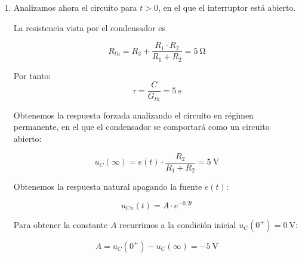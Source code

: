 \begin{enumerate}
\item

  Analizamos ahora el circuito para $t > 0$, en el que el interruptor
  está abierto.


  \begin{minipage}{0.6\linewidth}
    La resistencia vista por el condensador es

  \[
    R_{th} = R_3 + \frac{R_1 \cdot R_2}{R_1 + R_2} = \qty{5}{\ohm}
  \]

  Por tanto:
  \begin{equation*}
    \tau = \frac{C}{G_{th}} = \qty{5}{\second}
  \end{equation*}
\end{minipage}
\begin{minipage}{0.4\linewidth}
\end{minipage}

Obtenemos la respuesta forzada analizando el circuito en régimen
permanente, en el que el condensador se comportará como un circuito
abierto:

\begin{equation*}
  u_{C}(\infty) = e(t) \cdot \frac{R_2}{R_1 + R_2} = \qty{5}{\volt}
\end{equation*}

Obtenemos la respuesta natural apagando la fuente $e(t)$:

\begin{equation*}
  u_{Cn}(t) = A \cdot e^{-0.2t}
\end{equation*}

Para obtener la constante $A$ recurrimos a la condición inicial
$u_C(0^+) = \qty{0}{\volt}$:

\begin{equation*}
  A = u_C(0^+) - u_C(\infty) = \qty{-5}{\volt}
\end{equation*}


\end{enumerate}
